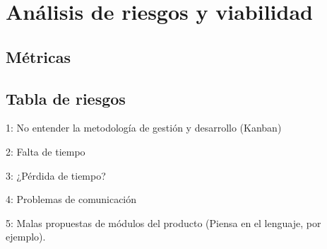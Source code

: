 \section{Análisis de riesgos y viabilidad}

\subsection{Métricas}

\subsection{Tabla de riesgos}

1: No entender la metodología de gestión y desarrollo (Kanban)

2: Falta de tiempo

3: ¿Pérdida de tiempo?

4: Problemas de comunicación

5: Malas propuestas de módulos del producto (Piensa en el lenguaje, por ejemplo).